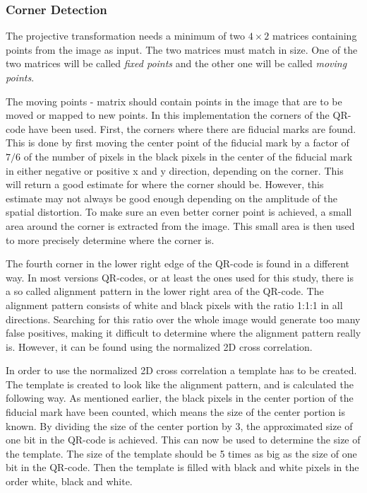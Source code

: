 \documentclass[12pt,a4paper]{article}
\begin{document}
\subsubsection{Corner Detection}
The projective transformation needs a minimum of two $4\times2$ matrices containing points from the image as input. The two matrices must match in size. One of the two matrices will be called \textit{fixed points} and the other one will be called \textit{moving points}.

The moving points - matrix should contain points in the image that are to be moved or mapped to new points. In this implementation the corners of the QR-code have been used. First, the corners where there are fiducial marks are found. This is done by first moving the center point of the fiducial mark by a factor of $7/6$ of the number of pixels in the black pixels in the center of the fiducial mark in either negative or positive x and y direction, depending on the corner. This will return a good estimate for where the corner should be. However, this estimate may not always be good enough depending on the amplitude of the spatial distortion. To make sure an even better corner point is achieved, a small area around the corner is extracted from the image. This small area is then used to more precisely determine where the corner is. 

The fourth corner in the lower right edge of the QR-code is found in a different way. In most versions QR-codes, or at least the ones used for this study, there is a so called alignment pattern in the lower right area of the QR-code. The alignment pattern consists of white and black pixels with the ratio 1:1:1 in all directions. Searching for this ratio over the whole image would generate too many false positives, making it difficult to determine where the alignment pattern really is. However, it can be found using the normalized 2D cross correlation. 

In order to use the normalized 2D cross correlation a template has to be created. The template is created to look like the alignment pattern, and is calculated the following way. As mentioned earlier, the black pixels in the center portion of the fiducial mark have been counted, which means the size of the center portion is known. By dividing the size of the center portion by 3, the approximated size of one bit in the QR-code is achieved. This can now be used to determine the size of the template. The size of the template should be 5 times as big as the size of one bit in the QR-code. Then the template is filled with black and white pixels in the order white, black and white. 
\end{document}
